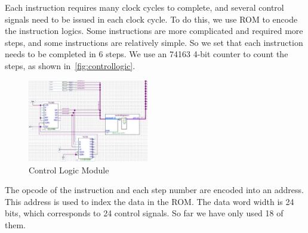 Each instruction requires many clock cycles to complete, and several control signals need to be issued in each clock cycle. To do this, we use ROM to encode the instruction logics. Some instructions are more complicated and required more steps, and some instructions are relatively simple. So we set that each instruction needs to be completed in 6 steps. We use an 74163 4-bit counter to count the steps, as shown in~\autoref{fig:controllogic}.

\begin{figure}[th]
	\includegraphics[width=0.47\textwidth]{figures/controllogic}
	\centering
	\caption{Control Logic Module}
	\label{fig:controllogic}
\end{figure}

The opcode of the instruction and each step number are encoded into an address. This address is used to index the data in the ROM. The data word width is 24 bits, which corresponds to 24 control signals. So far we have only used 18 of them.

